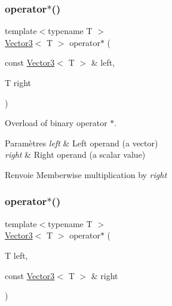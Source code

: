 \subsubsection{\texorpdfstring{operator$\ast$()}{operator*()}\hspace{0.1cm}{\footnotesize\ttfamily [1/2]}}
{\footnotesize\ttfamily template$<$typename T $>$ \\
\hyperlink{classsf_1_1Vector3}{Vector3}$<$ T $>$ operator$\ast$ (\begin{DoxyParamCaption}\item[{const \hyperlink{classsf_1_1Vector3}{Vector3}$<$ T $>$ \&}]{left,  }\item[{T}]{right }\end{DoxyParamCaption})\hspace{0.3cm}{\ttfamily [related]}}



Overload of binary operator $\ast$. 


\begin{DoxyParams}{Paramètres}
{\em left} & Left operand (a vector) \\
\hline
{\em right} & Right operand (a scalar value)\\
\hline
\end{DoxyParams}
\begin{DoxyReturn}{Renvoie}
Memberwise multiplication by {\itshape right} 
\end{DoxyReturn}
\mbox{\label{classsf_1_1Vector3_aa6f2b0d9f79c1b9774759b7087affbb1}} 
\subsubsection{\texorpdfstring{operator$\ast$()}{operator*()}\hspace{0.1cm}{\footnotesize\ttfamily [2/2]}}
{\footnotesize\ttfamily template$<$typename T $>$ \\
\hyperlink{classsf_1_1Vector3}{Vector3}$<$ T $>$ operator$\ast$ (\begin{DoxyParamCaption}\item[{T}]{left,  }\item[{const \hyperlink{classsf_1_1Vector3}{Vector3}$<$ T $>$ \&}]{right }\end{DoxyParamCaption})\hspace{0.3cm}{\ttfamily [related]}}



